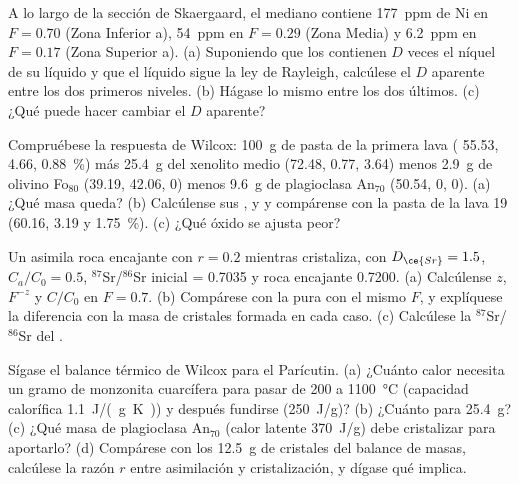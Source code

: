 \begin{exercise}[$\star\star$]\label{exo:b2:magmatic-differentiation:8}
A lo largo de la sección de Skaergaard, el  mediano contiene \qty{177}{ppm} de Ni en
$F = 0.70$ (Zona Inferior a), \qty{54}{ppm} en $F = 0.29$ (Zona Media) y
\qty{6.2}{ppm} en $F = 0.17$ (Zona Superior a). (a) Suponiendo que los  contienen
$D$ veces el níquel de su líquido y que el líquido sigue la ley de Rayleigh,
calcúlese el $D$ aparente entre los dos primeros niveles. (b) Hágase lo mismo entre los
dos últimos. (c) ¿Qué puede hacer cambiar el $D$ aparente?
\end{exercise}

\begin{exercise}[$\star\star$]\label{exo:b2:magmatic-differentiation:9}
Compruébese la respuesta de Wilcox: \qty{100}{g} de pasta de la primera lava (
55.53,  4.66,  \qty{0.88}{\percent}) más \qty{25.4}{g} del xenolito
medio (72.48, 0.77, 3.64) menos \qty{2.9}{g} de olivino Fo$_{80}$ (39.19, 42.06, 0)
menos \qty{9.6}{g} de plagioclasa An$_{70}$ (50.54, 0, 0). (a) ¿Qué masa queda?
(b) Calcúlense sus ,  y  y compárense con la pasta de la
lava 19 (60.16, 3.19 y \qty{1.75}{\percent}). (c) ¿Qué óxido se ajusta peor?
\end{exercise}

\begin{exercise}[$\star\star\star$]\label{exo:b2:magmatic-differentiation:10}
Un  asimila roca encajante con $r = 0.2$ mientras cristaliza, con $D_{\ce{Sr}} =
1.5$, $C_a/C_0 = 0.5$, $^{87}$Sr/$^{86}$Sr inicial = 0.7035 y roca encajante 0.7200.
(a) Calcúlense $z$, $F^{-z}$ y $C/C_0$ en $F = 0.7$. (b) Compárese con la  pura con el mismo $F$, y explíquese la diferencia con la masa de cristales
formada en cada caso. (c) Calcúlese la $^{87}$Sr/$^{86}$Sr del .
\end{exercise}

\begin{exercise}[$\star\star\star$]\label{exo:b2:magmatic-differentiation:11}
Sígase el balance térmico de Wilcox para el Parícutin. (a) ¿Cuánto calor necesita un gramo de monzonita
cuarcífera para pasar de 200 a \qty{1100}{\celsius} (capacidad calorífica
\qty{1.1}{J/(g.K)}) y después fundirse (\qty{250}{J/g})? (b) ¿Cuánto para
\qty{25.4}{g}? (c) ¿Qué masa de plagioclasa An$_{70}$ (calor latente \qty{370}{J/g})
debe cristalizar para aportarlo? (d) Compárese con los \qty{12.5}{g} de cristales del
balance de masas, calcúlese la razón $r$ entre asimilación y cristalización, y dígase qué
implica.
\end{exercise}

